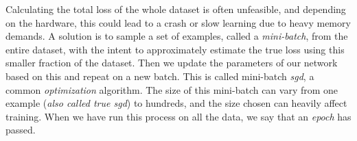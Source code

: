     Calculating the total loss of the whole dataset is often unfeasible, and depending on the hardware, this could lead to a crash or slow learning due to
    heavy memory demands. A solution is to sample a set of examples, called a \textit{mini-batch}, from the entire dataset, with the intent to approximately estimate
    the true loss using this smaller fraction of the dataset. Then we update the parameters of our network based on this and repeat on a new batch. This is called mini-batch \textit{\gls{sgd}}, a common \textit{optimization} algorithm\cite{Goodfellow-et-al-2016}. The size of this mini-batch can vary from one example (\textit{also called true \gls{sgd}}) to hundreds, and the size chosen can heavily affect training. When we have run this process on all the data, we say that an \textit{epoch} has passed.\cite{wilson2001need_learning_rate}
    
    
    
    
    
    
    
